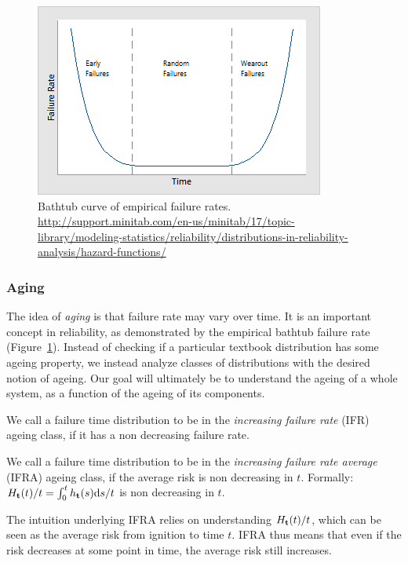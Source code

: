 \begin{figure}[ht]
\centering
\includegraphics[width=0.5\linewidth]{art/bathtub_curve}
\caption[Bathtub empirical hazard curve]{Bathtub curve of empirical failure rates. \newline
\url{http://support.minitab.com/en-us/minitab/17/topic-library/modeling-statistics/reliability/distributions-in-reliability-analysis/hazard-functions/}}
\label{fig:bathtub}
\end{figure}




\subsubsection{Aging}
The idea of \emph{aging} is that failure rate may vary over time. It is an important concept in reliability, as demonstrated by the empirical bathtub failure rate (Figure~\ref{fig:bathtub}).
Instead of checking if a particular textbook distribution has some ageing property, we instead analyze classes of distributions with the desired notion of ageing.
Our goal will ultimately be to understand the ageing of a whole system, as a function of the ageing of its components.

\begin{definition}[IFR]
We call a failure time distribution to be in the \emph{increasing failure rate} (IFR) ageing class, if it has a non decreasing failure rate.
\end{definition}


\begin{definition}[IFRA]
We call a failure time distribution to be in the \emph{increasing failure rate average} (IFRA) ageing class, if the average risk is non decreasing in $t$. 
Formally: $H_{\mathbf{t}} (t)/t=\int_0^t h_{\mathbf{t}} (s)\mathrm{d} s/t$ is non decreasing in $t$.
\end{definition}
The intuition underlying IFRA relies on understanding $H_{\mathbf{t}} (t)/t$, which can be seen as the average risk from ignition to time $t$. 
IFRA thus means that even if the risk decreases at some point in time, the average risk still increases. 


